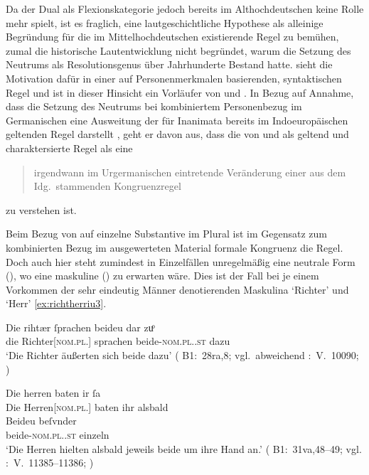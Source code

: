 Da der Dual als Flexionskategorie jedoch bereits im Althochdeutschen keine
Rolle mehr spielt, ist es fraglich, eine lautgeschichtliche Hypothese als
alleinige Begründung für die im Mittel\-hoch\-deutschen existierende Regel zu
bemühen, zumal die historische Lautentwicklung nicht begründet, warum die
Setzung des Neutrums als Resolutionsgenus über Jahrhunderte Bestand hatte.
\citet{askedal1973} sieht die Motivation dafür in einer auf Personenmerkmalen
basierenden, syntaktischen Regel und ist in dieser Hinsicht ein Vorläufer von
\citet{corbett1983} und \citet{wechslerzlatic2003}. In Bezug auf
 Annahme, dass die Setzung des Neutrums bei
kombiniertem Personenbezug im Germanischen eine Ausweitung der für Inanimata
bereits im Indoeuropäischen geltenden Regel darstellt
\autocite[vgl.~auch][156--157]{hock2008}, geht er davon aus, dass die von
\citet[28]{behaghel1928} und \citet[188]{dal2014} als 
geltend und  charaktersierte Regel als eine
\blockcquote[15]{askedal1973}{irgendwann im Urgermanischen
eintretende\textdel{} Veränderung einer aus dem Idg.\ stammenden
Kongruenzregel} zu verstehen ist.

Beim Bezug von  auf einzelne Substantive im Plural ist im
Gegensatz zum kombinierten Bezug im ausgewerteten Material formale Kongruenz
die Regel. Doch auch hier steht zumindest in Einzelfällen unregelmäßig eine
neutrale Form (), wo eine maskuline () zu erwarten
wäre. Dies ist der Fall bei je einem Vorkommen der sehr eindeutig Männer
denotierenden Maskulina  `Richter' und 
`Herr' \cref{ex:richtherriu3}.

\begin{exe}
\ex \label{ex:richtherriu3}
	\begin{xlist}
	\ex \gll Die rihtær ſprachen beideu {dar zuͦ} \\
			die Richter[\textsc{nom.pl.\MascM}] sprachen
				beide-\textsc{nom.pl.\NeutM.st} dazu \\
		\trans `Die Richter äußerten sich beide dazu'
			(%
				B1:~28ra,8; vgl.~abweichend
				\KC:~V.~10090;
				\cite[267]{schroeder1895}%
			)
		\label{ex:richtherriu3_1}

	\ex \gll Die herren baten ir ſa \\
			Die Herren[\textsc{nom.pl.\MascM}] baten ihr alsbald \\
	\sn \gll Beideu beſvnder \\
			beide-\textsc{nom.pl.\NeutM.st} einzeln \\
		\trans `Die Herren hielten alsbald jeweils beide um ihre Hand an.'
			(%
				B1:~31va,48--49; vgl.
				\KC:~V.~11385--11386;
				\cite[289]{schroeder1895}%
			)
		\label{ex:richtherriu3_2}
	\end{xlist}
\end{exe}

